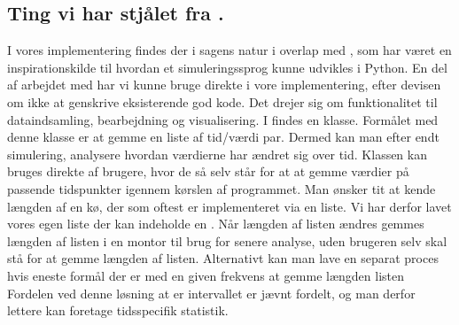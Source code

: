 \subsection{Ting vi har stjålet fra \simpy.}
I vores implementering findes der i sagens natur i overlap med \simpy, som har været en inspirationskilde til hvordan et simuleringssprog kunne udvikles i Python. En del af arbejdet med \simpy har vi kunne bruge direkte i vore implementering, efter devisen om ikke at genskrive eksisterende god kode. Det drejer sig om funktionalitet til dataindsamling, bearbejdning og visualisering. I \simpy findes en klasse. Formålet med denne klasse er at gemme en liste af tid/værdi par. Dermed kan man efter endt simulering, analysere  hvordan værdierne har ændret sig over tid. Klassen  kan bruges direkte af brugere, hvor de så selv  står for at at gemme værdier på passende tidspunkter igennem kørslen af programmet. Man ønsker tit at kende længden af en kø, der som oftest er implementeret via en liste. Vi har derfor lavet vores egen liste der kan indeholde en . Når længden af listen ændres gemmes længden af listen i en montor til brug for senere analyse, uden brugeren selv skal stå for at gemme længden af listen. Alternativt kan man lave en separat proces hvis eneste formål der er med en given frekvens at gemme længden listen Fordelen ved denne løsning at er intervallet er jævnt fordelt, og man derfor lettere kan foretage tidsspecifik statistik.


